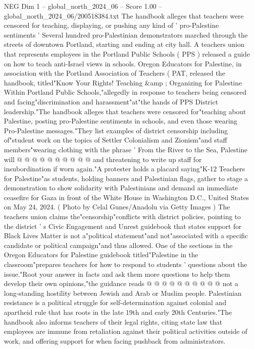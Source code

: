 \begin{textsample}{NEG Dim 1 – global\_north\_2024\_06 – Score 1.00 – global\_north\_2024\_06/200518384.txt}  \label{ex:f1_neg_214}
The handbook alleges that teachers were censored for teaching, displaying, or pushing any kind of ' pro-Palestine sentiments ' Several hundred pro-Palestinian demonstrators marched through the streets of downtown Portland, starting and ending at city hall.
A teachers union that represents employees in the Portland Public Schools ( PPS ) released a guide on how to teach anti-Israel views in schools.
Oregon Educators for Palestine, in association with the Portland Association of Teachers ( PAT, released the handbook, titled"Know Your Rights!
Teaching \&amp ; Organizing for Palestine Within Portland Public Schools,"allegedly in response to teachers being censored and facing"discrimination and harassment"at"the hands of PPS District leadership."The handbook alleges that teachers were censored for"teaching about Palestine, posting pro-Palestine sentiments in schools, and even those wearing Pro-Palestine messages."They list examples of district censorship including of"student work on the topics of Settler Colonialism and Zionism"and staff members"wearing clothing with the phrase ' From the River to the Sea, Palestine will @ @ @ @ @ @ @ @ @ @ and threatening to write up staff for insubordination if worn again."A protester holds a placard saying"K-12 Teachers for Palestine"as students, holding banners and Palestinian flags, gather to stage a demonstration to show solidarity with Palestinians and demand an immediate ceasefire for Gaza in front of the White House in Washington D.C., United States on May 24, 2024. ( Photo by Celal Gunes/Anadolu via Getty Images ) The teachers union claims the"censorship"conflicts with district policies, pointing to the district ' s Civic Engagement and Unrest guidebook that states support for Black Lives Matter is not a"political statement"and not"associated with a specific candidate or political campaign"and thus allowed.
One of the sections in the Oregon Educators for Palestine guidebook titled"Palestine in the classroom"prepares teachers for how to respond to students ' questions about the issue."Root your answer in facts and ask them more questions to help them develop their own opinions,"the guidance reads @ @ @ @ @ @ @ @ @ @ not a long-standing hostility between Jewish and Arab or Muslim people.
Palestinian resistance is a political struggle for self-determination against colonial and apartheid rule that has roots in the late 19th and early 20th Centuries."The handbook also informs teachers of their legal rights, citing state law that employees are immune from retaliation against their political activities outside of work, and offering support for when facing pushback from administrators.

\end{textsample}
